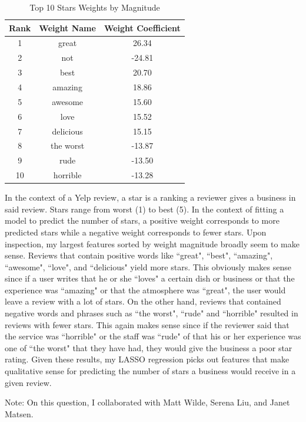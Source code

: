 \documentclass[12pt]{amsart}
\begin{document}
\begin{table}[H]
	\centering
	\caption{Top 10 Stars Weights by Magnitude}
	\begin{tabular}{ccc} 
		\hline
		Rank & Weight Name & Weight Coefficient \\
		\hline
		1 & great & 26.34 \\
		2 & not & -24.81 \\
		3 & best & 20.70 \\
		4 & amazing & 18.86 \\
		5 & awesome & 15.60  \\ 
		6 & love & 15.52  \\
		7 & delicious & 15.15  \\
		8 & the worst & -13.87  \\
		9 & rude & -13.50 \\
		10 & horrible & -13.28 \\
		\hline
	\end{tabular}
	\label{tab:top_stars}
\end{table}

In the context of a Yelp review, a star is a ranking a reviewer gives a business in said review.  Stars range from worst (1) to best (5).  In the context of fitting a model to predict the number of stars, a positive weight corresponds to more predicted stars while a negative weight corresponds to fewer stars.    Upon inspection, my largest features sorted by weight magnitude broadly seem to make sense.  Reviews that contain positive words like ``great", ``best", ``amazing", ``awesome", ``love", and ``delicious" yield more stars.  This obviously makes sense since if a user writes that he or she ``loves" a certain dish or business or that the experience was ``amazing" or that the atmosphere was ``great", the user would leave a review with a lot of stars.  On the other hand, reviews that contained negative words and phrases such as ``the worst", ``rude" and ``horrible" resulted in reviews with fewer stars.  This again makes sense since if the reviewer said that the service was ``horrible" or the staff was ``rude" of that his or her experience was one of ``the worst" that they have had, they would give the business a poor star rating.  Given these results, my LASSO regression picks out features that make qualitative sense for predicting the number of stars a business would receive in a given review.

Note: On this question, I collaborated with Matt Wilde, Serena Liu, and Janet Matsen.
\end{document}
